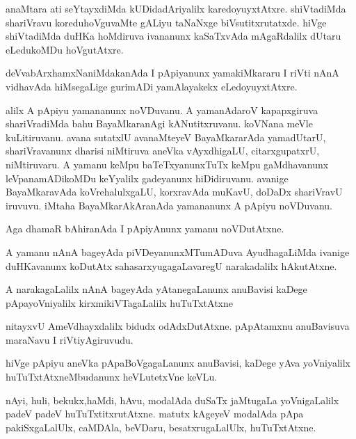 \documentclass{article}
\begin{document}
\begin{mn}
anaMtara ati seYtayxdiMda kUDidadAriyalilx  karedoyuyxtAtxre. shiVtadiMda  
shariVravu koreduhoVguvaMte  gALiyu  taNaNxge biVsutitxrutatxde. hiVge shiVtadiMda
duHKa hoMdiruva  ivananunx  kaSaTxvAda  mAgaRdalilx dUtaru eLedukoMDu hoVgutAtxre.
\end{mn}

\begin{mn}
deVvabArxhamxNaniMdakanAda I pApiyanunx yamakiMkararu  I riVti nAnA vidhavAda  
hiMsegaLige  gurimADi yamAlayakekx eLedoyuyxtAtxre. 
\end{mn}

\begin{mn}
alilx A pApiyu yamananunx noVDuvanu. A yamanAdaroV  kapapxgiruva shariVradiMda 
bahu BayaMkaranAgi kANutitxruvanu.  koVNana meVle kuLitiruvanu.  avana sutatxlU 
avanaMteyeV BayaMkararAda  yamadUtarU, shariVravanunx dharisi niMtiruva  
aneVka  vAyxdhigaLU, citarxgupatxrU, niMtiruvaru. A yamanu keMpu baTeTxyanunxTuTx  
keMpu gaMdhavanunx leVpanamADikoMDu keYyalilx gadeyanunx hiDidiruvanu.  
avanige BayaMkaravAda koVrehalulxgaLU, korxravAda muKavU, doDaDx shariVravU  
iruvuvu.  iMtaha BayaMkarAkAranAda  yamananunx A pApiyu noVDuvanu.
\end{mn}

\begin{mn}
Aga dhamaR bAhiranAda  I pApiyAnunx yamanu noVDutAtxne. 
\end{mn}

\begin{mn}
A yamanu nAnA bageyAda piVDeyanunxMTumADuva AyudhagaLiMda ivanige duHKavanunx  
koDutAtx  sahasarxyugagaLavaregU  narakadalilx hAkutAtxne.
\end{mn}

\begin{mn}
A narakagaLalilx nAnA bageyAda yAtanegaLanunx anuBavisi kaDege pApayoVniyalilx 
kirxmikiVTagaLalilx huTuTxtAtxne
\end{mn}

\begin{mn}
nitayxvU AmeVdhayxdalilx bidudx odAdxDutAtxne. pApAtamxnu anuBavisuva maraNavu  I riVtiyAgiruvudu.
\end{mn}

\begin{mn}
hiVge pApiyu aneVka pApaBoVgagaLanunx anuBavisi,  kaDege yAva yoVniyalilx 
huTuTxtAtxneMbudanunx heVLutetxVne keVLu.
\end{mn}

\begin{mn}
nAyi, huli, bekukx,haMdi, hAvu, modalAda duSaTx jaMtugaLa yoVnigaLalilx padeV
 padeV huTuTxtitxrutAtxne. matutx kAgeyeV modalAda pApa pakiSxgaLalUlx, 
 caMDAla, beVDaru, besatxrugaLalUlx, huTuTxtAtxne.
\end{mn}
\end{document}
